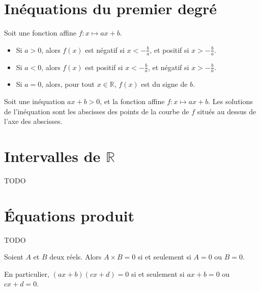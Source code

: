 \section{Inéquations du premier degré}

\begin{propriete}
  Soit une fonction affine $f:x\mapsto ax+b$.
  \begin{itemize}
    \item Si $a>0$, alors $f(x)$ est négatif si $x<-\frac{b}{a}$, et positif si $x>-\frac{b}{a}$.
    \item Si $a<0$, alors $f(x)$ est positif si $x<-\frac{b}{a}$, et négatif si $x>-\frac{b}{a}$.
    \item Si $a=0$, alors, pour tout $x\in{\mathbb R}$, $f(x)$ est du signe de $b$.
  \end{itemize}
\end{propriete}

\begin{methode}
  Soit une inéquation $ax+b>0$, et la fonction affine $f:x\mapsto ax+b$. Les
  solutions de l'inéquation sont les abscisses des points de la courbe de $f$
  situés au dessus de l'axe des abscisses.
\end{methode}


\section{Intervalles de $\mathbb{R}$}

TODO

\section{Équations produit}

TODO

\begin{propriete}
  Soient $A$ et $B$ deux réels. Alors $A\times B=0$ si et seulement si $A=0$ ou $B=0$.

  En particulier, $(ax+b)(cx+d)=0$ si et seulement si $ax+b=0$ ou $cx+d=0$.
\end{propriete}
